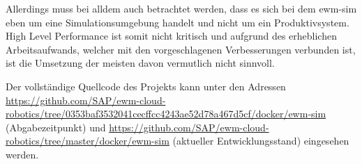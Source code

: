 Allerdings muss bei alldem auch betrachtet werden, dass es sich bei dem \ac{ewm-sim} eben um eine Simulationsumgebung handelt und nicht um ein Produktivsystem.
High Level Performance ist somit nicht kritisch und aufgrund des erheblichen Arbeitsaufwands, welcher mit den vorgeschlagenen Verbesserungen verbunden ist, ist die Umsetzung der meisten davon vermutlich nicht sinnvoll.

Der vollständige Quellcode des Projekts kann unter den Adressen \url{https://github.com/SAP/ewm-cloud-robotics/tree/0353baf3532041cecffcc4243ae52d78a467d5cf/docker/ewm-sim} (Abgabezeitpunkt) und \url{https://github.com/SAP/ewm-cloud-robotics/tree/master/docker/ewm-sim} (aktueller Entwicklungsstand) eingesehen werden.